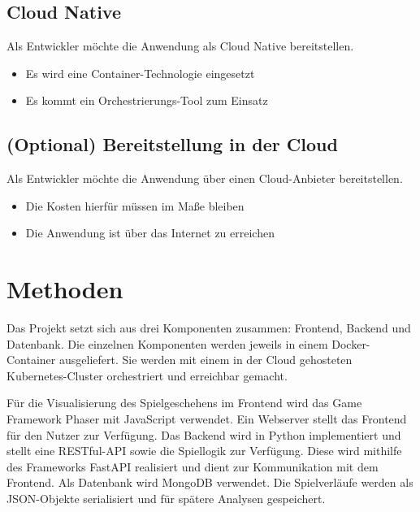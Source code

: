 \documentclass[a4paper, 10pt, conference]{IEEEtran}
\begin{document}
\subsection{Cloud Native}
Als Entwickler möchte die Anwendung als Cloud Native bereitstellen.
\begin{itemize}
	\item Es wird eine Container-Technologie eingesetzt
	\item Es kommt ein Orchestrierungs-Tool zum Einsatz
\end{itemize}

\subsection{(Optional) Bereitstellung in der Cloud}
Als Entwickler möchte die Anwendung über einen Cloud-Anbieter bereitstellen.
\begin{itemize}
	\item Die Kosten hierfür müssen im Maße bleiben
	\item Die Anwendung ist über das Internet zu erreichen
\end{itemize}

\section{Methoden}\label{sec:methoden}

Das Projekt setzt sich aus drei Komponenten zusammen: Frontend, Backend und Datenbank.
Die einzelnen Komponenten werden jeweils in einem Docker-Container ausgeliefert.
Sie werden mit einem in der Cloud gehosteten Kubernetes-Cluster orchestriert und erreichbar gemacht.

Für die Visualisierung des Spielgeschehens im Frontend wird das Game Framework Phaser mit JavaScript verwendet. 
Ein Webserver stellt das Frontend für den Nutzer zur Verfügung.
Das Backend wird in Python implementiert und stellt eine RESTful-API sowie die Spiellogik zur Verfügung.
Diese wird mithilfe des Frameworks FastAPI realisiert und dient zur Kommunikation mit dem Frontend.
Als Datenbank wird MongoDB verwendet. Die Spielverläufe werden als JSON-Objekte serialisiert und für spätere Analysen gespeichert.

\printbibliography
\end{document}

